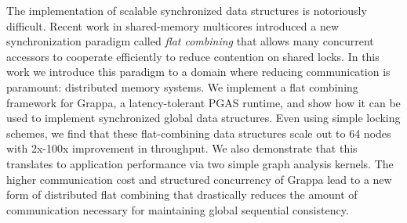 The implementation of scalable synchronized data structures is notoriously difficult. Recent work in shared-memory multicores introduced a new synchronization paradigm called \emph{flat combining} that allows many concurrent accessors to cooperate efficiently to reduce contention on shared locks.
In this work we introduce this paradigm to a domain where reducing communication is paramount: distributed memory systems.
We implement a flat combining framework for Grappa, a latency-tolerant PGAS runtime, and show how it can be used to implement synchronized global data structures.
Even using simple locking schemes, we find that these flat-combining data structures scale out to 64 nodes with 2x-100x improvement in throughput. We also demonstrate that this translates to application performance via two simple graph analysis kernels.
The higher communication cost and structured concurrency of Grappa lead to a new form of distributed flat combining that drastically reduces the amount of communication necessary for maintaining global sequential consistency.
